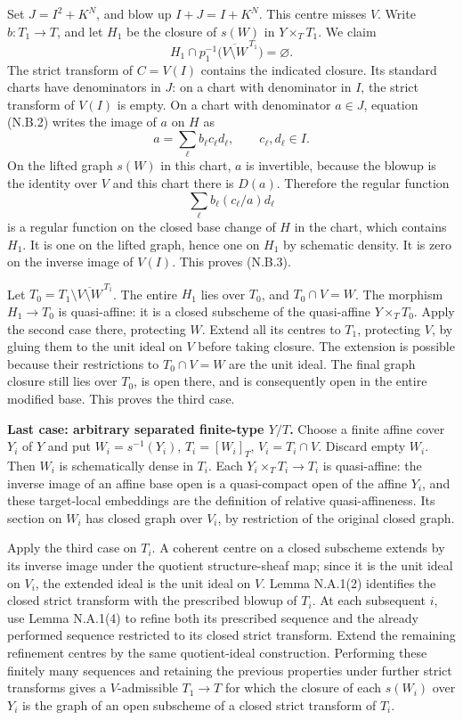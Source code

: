 \documentclass[11pt]{article}
\begin{document}
Set \(J=I^2+K^N\), and blow up \(I+J=I+K^N\). This centre misses \(V\).
Write \(b:T_1\to T\), and let \(H_1\) be the closure of \(s(W)\) in
\(Y\times_T T_1\). We claim \[
H_1\cap p_1^{-1}\bigl(\overline{V\setminus W}^{\,T_1}\bigr)=\varnothing.
\tag{N.B.3}
\] The strict transform of \(C=V(I)\) contains the indicated closure.
Its standard charts have denominators in \(J\): on a chart with
denominator in \(I\), the strict transform of \(V(I)\) is empty. On a
chart with denominator \(a\in J\), equation (N.B.2) writes the image of
\(a\) on \(H\) as \[
a=\sum_\ell b_\ell c_\ell d_\ell,
\qquad c_\ell,d_\ell\in I.
\] On the lifted graph \(s(W)\) in this chart, \(a\) is invertible,
because the blowup is the identity over \(V\) and this chart there is
\(D(a)\). Therefore the regular function \[
\sum_\ell b_\ell(c_\ell/a)d_\ell
\] is a regular function on the closed base change of \(H\) in the
chart, which contains \(H_1\). It is one on the lifted graph, hence one
on \(H_1\) by schematic density. It is zero on the inverse image of
\(V(I)\). This proves (N.B.3).

Let \(T_0=T_1\setminus\overline{V\setminus W}^{\,T_1}\). The entire
\(H_1\) lies over \(T_0\), and \(T_0\cap V=W\). The morphism
\(H_1\to T_0\) is quasi-affine: it is a closed subscheme of the
quasi-affine \(Y\times_T T_0\). Apply the second case there, protecting
\(W\). Extend all its centres to \(T_1\), protecting \(V\), by gluing
them to the unit ideal on \(V\) before taking closure. The extension is
possible because their restrictions to \(T_0\cap V=W\) are the unit
ideal. The final graph closure still lies over \(T_0\), is open there,
and is consequently open in the entire modified base. This proves the
third case.

\textbf{Last case: arbitrary separated finite-type \(Y/T\).} Choose a
finite affine cover \(Y_i\) of \(Y\) and put \(W_i=s^{-1}(Y_i)\),
\(T_i=[W_i]_T\), \(V_i=T_i\cap V\). Discard empty \(W_i\). Then \(W_i\)
is schematically dense in \(T_i\). Each \(Y_i\times_T T_i\to T_i\) is
quasi-affine: the inverse image of an affine base open is a
quasi-compact open of the affine \(Y_i\), and these target-local
embeddings are the definition of relative quasi-affineness. Its section
on \(W_i\) has closed graph over \(V_i\), by restriction of the original
closed graph.

Apply the third case on \(T_i\). A coherent centre on a closed subscheme
extends by its inverse image under the quotient structure-sheaf map;
since it is the unit ideal on \(V_i\), the extended ideal is the unit
ideal on \(V\). Lemma N.A.1(2) identifies the closed strict transform
with the prescribed blowup of \(T_i\). At each subsequent \(i\), use
Lemma N.A.1(4) to refine both its prescribed sequence and the already
performed sequence restricted to its closed strict transform. Extend the
remaining refinement centres by the same quotient-ideal construction.
Performing these finitely many sequences and retaining the previous
properties under further strict transforms gives a \(V\)-admissible
\(T_1\to T\) for which the closure of each \(s(W_i)\) over \(Y_i\) is
the graph of an open subscheme of a closed strict transform of \(T_i\).
\end{document}
